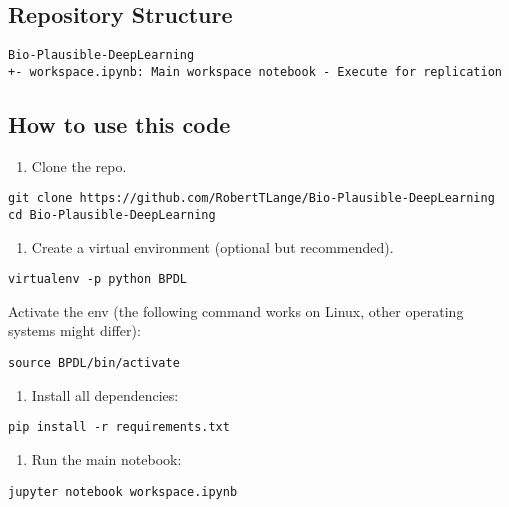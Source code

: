 \hypertarget{repository-structure}{%
\subsection{Repository Structure}\label{repository-structure}}

\begin{verbatim}
Bio-Plausible-DeepLearning
+- workspace.ipynb: Main workspace notebook - Execute for replication
\end{verbatim}

\hypertarget{how-to-use-this-code}{%
\subsection{How to use this code}\label{how-to-use-this-code}}

\begin{enumerate}
\def\labelenumi{\arabic{enumi}.}
\tightlist
\item
  Clone the repo.
\end{enumerate}

\begin{verbatim}
git clone https://github.com/RobertTLange/Bio-Plausible-DeepLearning
cd Bio-Plausible-DeepLearning
\end{verbatim}

\begin{enumerate}
\def\labelenumi{\arabic{enumi}.}
\setcounter{enumi}{1}
\tightlist
\item
  Create a virtual environment (optional but recommended).
\end{enumerate}

\begin{verbatim}
virtualenv -p python BPDL
\end{verbatim}

Activate the env (the following command works on Linux, other operating
systems might differ):

\begin{verbatim}
source BPDL/bin/activate
\end{verbatim}

\begin{enumerate}
\def\labelenumi{\arabic{enumi}.}
\setcounter{enumi}{2}
\tightlist
\item
  Install all dependencies:
\end{enumerate}

\begin{verbatim}
pip install -r requirements.txt
\end{verbatim}

\begin{enumerate}
\def\labelenumi{\arabic{enumi}.}
\setcounter{enumi}{3}
\tightlist
\item
  Run the main notebook:
\end{enumerate}

\begin{verbatim}
jupyter notebook workspace.ipynb
\end{verbatim}
